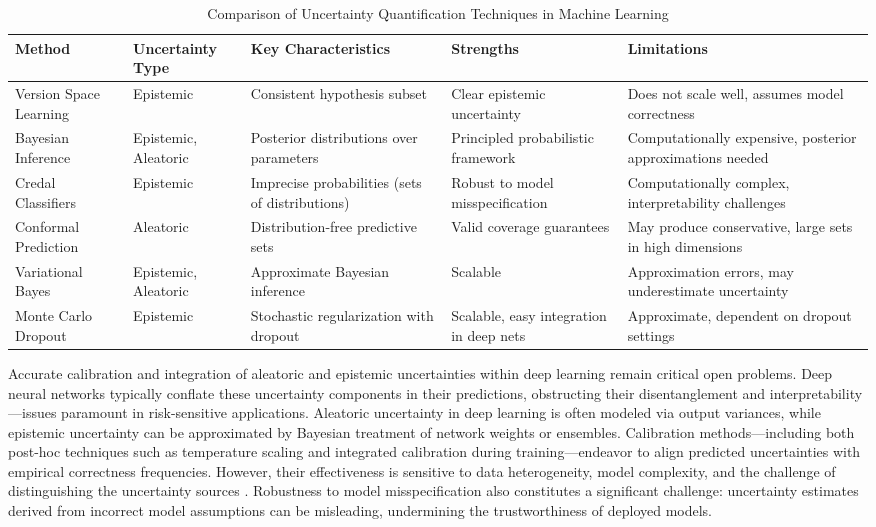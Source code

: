 \documentclass[sigconf]{acmart}
\begin{document}
\begin{table*}[htbp]
\centering
\caption{Comparison of Uncertainty Quantification Techniques in Machine Learning}
\label{tab:uq_comparison}
\begin{adjustbox}{max width=\textwidth}
\begin{tabular}{@{}lllll@{}}
\toprule
\textbf{Method} & \textbf{Uncertainty Type} & \textbf{Key Characteristics} & \textbf{Strengths} & \textbf{Limitations} \\ \midrule
Version Space Learning & Epistemic & Consistent hypothesis subset & Clear epistemic uncertainty & Does not scale well, assumes model correctness \\
Bayesian Inference & Epistemic, Aleatoric & Posterior distributions over parameters & Principled probabilistic framework & Computationally expensive, posterior approximations needed \\
Credal Classifiers & Epistemic & Imprecise probabilities (sets of distributions) & Robust to model misspecification & Computationally complex, interpretability challenges \\
Conformal Prediction & Aleatoric & Distribution-free predictive sets & Valid coverage guarantees & May produce conservative, large sets in high dimensions \\
Variational Bayes & Epistemic, Aleatoric & Approximate Bayesian inference & Scalable & Approximation errors, may underestimate uncertainty \\
Monte Carlo Dropout & Epistemic & Stochastic regularization with dropout & Scalable, easy integration in deep nets & Approximate, dependent on dropout settings \\ \bottomrule
\end{tabular}
\end{adjustbox}
\end{table*}

Accurate calibration and integration of aleatoric and epistemic uncertainties within deep learning remain critical open problems. Deep neural networks typically conflate these uncertainty components in their predictions, obstructing their disentanglement and interpretability—issues paramount in risk-sensitive applications. Aleatoric uncertainty in deep learning is often modeled via output variances, while epistemic uncertainty can be approximated by Bayesian treatment of network weights or ensembles. Calibration methods—including both post-hoc techniques such as temperature scaling and integrated calibration during training—endeavor to align predicted uncertainties with empirical correctness frequencies. However, their effectiveness is sensitive to data heterogeneity, model complexity, and the challenge of distinguishing the uncertainty sources \cite{ref28}. Robustness to model misspecification also constitutes a significant challenge: uncertainty estimates derived from incorrect model assumptions can be misleading, undermining the trustworthiness of deployed models.
\end{document}
